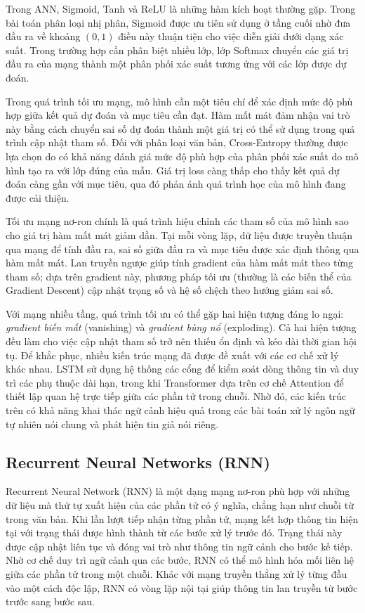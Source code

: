 Trong ANN, Sigmoid, Tanh và ReLU là những hàm kích hoạt thường gặp. Trong bài toán phân loại nhị phân, Sigmoid được ưu tiên sử dụng ở tầng cuối nhờ đưa đầu ra về khoảng $(0,1)$ điều này thuận tiện cho việc diễn giải dưới dạng xác suất. Trong trường hợp cần phân biệt nhiều lớp, lớp Softmax chuyển các giá trị đầu ra của mạng thành một phân phối xác suất tương ứng với các lớp được dự đoán.

Trong quá trình tối ưu mạng, mô hình cần một tiêu chí để xác định mức độ phù hợp giữa kết quả dự đoán và mục tiêu cần đạt. Hàm mất mát đảm nhận vai trò này bằng cách chuyển sai số dự đoán thành một giá trị có thể sử dụng trong quá trình cập nhật tham số. Đối với phân loại văn bản, Cross-Entropy thường được lựa chọn do có khả năng đánh giá mức độ phù hợp của phân phối xác suất do mô hình tạo ra với lớp đúng của mẫu. Giá trị loss càng thấp cho thấy kết quả dự đoán càng gần với mục tiêu, qua đó phản ánh quá trình học của mô hình đang được cải thiện.

Tối ưu mạng nơ-ron chính là quá trình hiệu chỉnh các tham số của mô hình sao cho giá trị hàm mất mát giảm dần. Tại mỗi vòng lặp, dữ liệu được truyền thuận qua mạng để tính đầu ra, sai số giữa đầu ra và mục tiêu được xác định thông qua hàm mất mát. Lan truyền ngược giúp tính gradient của hàm mất mát theo từng tham số; dựa trên gradient này, phương pháp tối ưu (thường là các biến thể của Gradient Descent) cập nhật trọng số và hệ số chệch theo hướng giảm sai số.

Với mạng nhiều tầng, quá trình tối ưu có thể gặp hai hiện tượng đáng lo ngại: \textit{gradient biến mất} (vanishing) và \textit{gradient bùng nổ} (exploding). Cả hai hiện tượng đều làm cho việc cập nhật tham số trở nên thiếu ổn định và kéo dài thời gian hội tụ. Để khắc phục, nhiều kiến trúc mạng đã được đề xuất với các cơ chế xử lý khác nhau. LSTM sử dụng hệ thống các cổng để kiểm soát dòng thông tin và duy trì các phụ thuộc dài hạn, trong khi Transformer dựa trên cơ chế Attention để thiết lập quan hệ trực tiếp giữa các phần tử trong chuỗi. Nhờ đó, các kiến trúc trên có khả năng khai thác ngữ cảnh hiệu quả trong các bài toán xử lý ngôn ngữ tự nhiên nói chung và phát hiện tin giả nói riêng.

\subsection{Recurrent Neural Networks (RNN)}

Recurrent Neural Network (RNN) là một dạng mạng nơ-ron phù hợp với những dữ liệu mà thứ tự xuất hiện của các phần tử có ý nghĩa, chẳng hạn như chuỗi từ trong văn bản. Khi lần lượt tiếp nhận từng phần tử, mạng kết hợp thông tin hiện tại với trạng thái được hình thành từ các bước xử lý trước đó. Trạng thái này được cập nhật liên tục và đóng vai trò như thông tin ngữ cảnh cho bước kế tiếp. Nhờ cơ chế duy trì ngữ cảnh qua các bước, RNN có thể mô hình hóa mối liên hệ giữa các phần tử trong một chuỗi. Khác với mạng truyền thẳng xử lý từng đầu vào một cách độc lập, RNN có vòng lặp nội tại giúp thông tin lan truyền từ bước trước sang bước sau.

